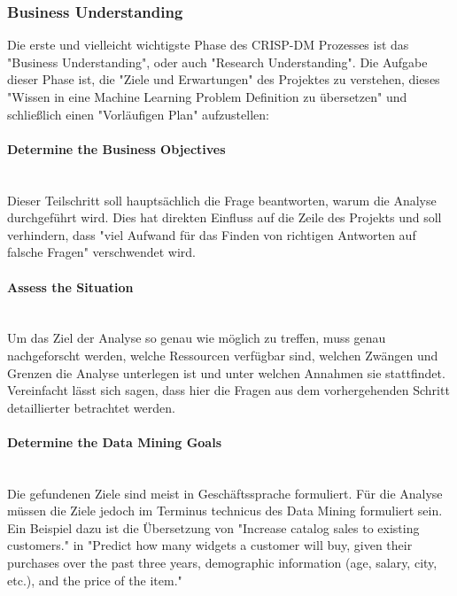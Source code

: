 \subsubsection{Business Understanding}
Die erste und vielleicht wichtigste Phase\citep[S.~14]{shearer_crisp-dm_2000} des CRISP-DM Prozesses ist das "Business Understanding", oder auch "Research Understanding"\citep[Punkt 1.4.1.1]{larose_discovering_2014}. Die Aufgabe dieser Phase ist, die "Ziele und Erwartungen"\citep[S.~73]{swamynathan_mastering_2017} des Projektes zu verstehen, dieses "Wissen in eine Machine Learning Problem Definition zu übersetzen" und schließlich einen "Vorläufigen Plan"\citep[S.~14]{shearer_crisp-dm_2000} aufzustellen: 
\paragraph{Determine the Business Objectives}\mbox{} \\
Dieser Teilschritt soll hauptsächlich die Frage beantworten, warum die Analyse durchgeführt wird. Dies hat direkten Einfluss auf die Zeile des Projekts und soll verhindern, dass "viel Aufwand für das Finden von richtigen Antworten auf falsche Fragen"\citep[S.~14]{chapman_crisp-dm_2000} verschwendet wird.
\paragraph{Assess the Situation}\mbox{} \\
Um das Ziel der Analyse so genau wie möglich zu treffen, muss genau nachgeforscht werden, welche Ressourcen verfügbar sind, welchen Zwängen und Grenzen die Analyse unterlegen ist und unter welchen Annahmen sie stattfindet.\citep[S.~14]{chapman_crisp-dm_2000} Vereinfacht lässt sich sagen, dass hier die Fragen aus dem vorhergehenden Schritt detaillierter betrachtet werden.
\paragraph{Determine the Data Mining Goals}\mbox{} \\
Die gefundenen Ziele sind meist in Geschäftssprache formuliert. Für die Analyse müssen die Ziele jedoch im Terminus technicus des Data Mining formuliert sein. Ein Beispiel dazu ist die Übersetzung von "Increase catalog sales to existing customers." in "Predict how many widgets a customer will buy, given their purchases over the
past three years, demographic information (age, salary, city, etc.), and the price of the item."\citep[S.~16]{chapman_crisp-dm_2000}
